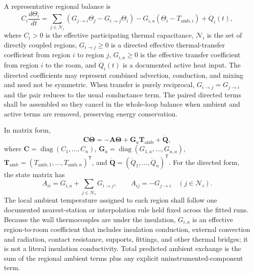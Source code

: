 \documentclass[11pt]{article}
\begin{document}
A representative regional balance is
\begin{equation}
    C_i\frac{d\Theta_i}{dt}
    =
    \sum_{j\in\mathcal N_i}
    \left(
        G_{j\rightarrow i}\Theta_j
        -G_{i\rightarrow j}\Theta_i
    \right)
    -G_{i,a}(\Theta_i-T_{\mathrm{amb},i})
    +\dot Q_i(t),
    \label{eq:zone_balance}
\end{equation}
where $C_i>0$ is the effective participating thermal capacitance, $\mathcal N_i$ is the set of directly coupled regions, $G_{i\rightarrow j}\geq0$ is a directed effective thermal-transfer coefficient from region $i$ to region $j$, $G_{i,a}\geq0$ is the effective transfer coefficient from region $i$ to the room, and $\dot Q_i(t)$ is a documented active heat input. The directed coefficients may represent combined advection, conduction, and mixing and need not be symmetric. When transfer is purely reciprocal, $G_{i\rightarrow j}=G_{j\rightarrow i}$ and the pair reduces to the usual conductance term. The paired directed terms shall be assembled so they cancel in the whole-loop balance when ambient and active terms are removed, preserving energy conservation.

In matrix form,
\begin{equation}
    \mathbf C\dot{\boldsymbol\Theta}
    =
    -\mathbf A\boldsymbol\Theta
    +\mathbf G_a\mathbf T_{\mathrm{amb}}
    +\dot{\mathbf Q},
    \label{eq:zone_matrix}
\end{equation}
where $\mathbf C=\operatorname{diag}(C_1,\ldots,C_n)$, $\mathbf G_a=\operatorname{diag}(G_{1,a},\ldots,G_{n,a})$, $\mathbf T_{\mathrm{amb}}=(T_{\mathrm{amb},1},\ldots,T_{\mathrm{amb},n})^{\mathsf T}$, and $\dot{\mathbf Q}=(\dot Q_1,\ldots,\dot Q_n)^{\mathsf T}$. For the directed form, the state matrix has
\begin{equation}
    A_{ii}=G_{i,a}+\sum_{j\in\mathcal N_i}G_{i\rightarrow j},
    \qquad
    A_{ij}=-G_{j\rightarrow i}
    \quad (j\in\mathcal N_i).
    \label{eq:conductance_matrix}
\end{equation}
The local ambient temperature assigned to each region shall follow one documented nearest-station or interpolation rule held fixed across the fitted runs. Because the wall thermocouples are under the insulation, $G_{i,a}$ is an effective region-to-room coefficient that includes insulation conduction, external convection and radiation, contact resistance, supports, fittings, and other thermal bridges; it is not a literal insulation conductivity. Total predicted ambient exchange is the sum of the regional ambient terms plus any explicit uninstrumented-component term.
\end{document}
